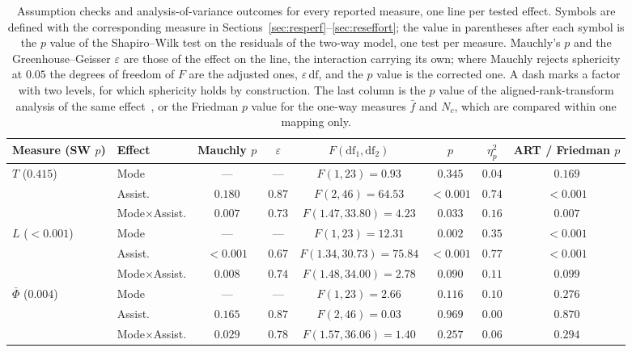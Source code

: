 \begin{table}[p]
\centering
\footnotesize
\caption[Assumption checks and analysis-of-variance outcomes for every reported measure]{Assumption checks and analysis-of-variance outcomes for every reported measure, one line per tested effect. Symbols are defined with the corresponding measure in Sections~\ref{sec:resperf}--\ref{sec:reseffort}; the value in parentheses after each symbol is the $p$ value of the Shapiro--Wilk test on the residuals of the two-way model, one test per measure. Mauchly's $p$ and the Greenhouse--Geisser $\varepsilon$ are those of the effect on the line, the interaction carrying its own; where Mauchly rejects sphericity at $0.05$ the degrees of freedom of $F$ are the adjusted ones, $\varepsilon\,\mathrm{df}$, and the $p$ value is the corrected one. A dash marks a factor with two levels, for which sphericity holds by construction. The last column is the $p$ value of the aligned-rank-transform analysis of the same effect~\cite{wobbrock2011art}, or the Friedman $p$ value for the one-way measures $\bar f$ and $N_c$, which are compared within one mapping only.}
\label{tab:assumptions}
\setlength{\tabcolsep}{3.5pt}\scriptsize
\begin{tabular}{@{}llcccccc@{}}
\toprule
Measure (SW $p$) & Effect & Mauchly $p$ & $\varepsilon$ & $F(\mathrm{df}_1,\mathrm{df}_2)$ & $p$ & $\eta^2_p$ & ART / Friedman $p$ \\
\midrule
$T$ ($0.415$) & Mode & --- & --- & $F(1,23)=0.93$ & $0.345$ & $0.04$ & $0.169$ \\
 & Assist. & $0.180$ & $0.87$ & $F(2,46)=64.53$ & $<0.001$ & $0.74$ & $<0.001$ \\
 & Mode$\times$Assist. & $0.007$ & $0.73$ & $F(1.47,33.80)=4.23$ & $0.033$ & $0.16$ & $0.007$ \\
\addlinespace[2pt]
$L$ ($<0.001$) & Mode & --- & --- & $F(1,23)=12.31$ & $0.002$ & $0.35$ & $<0.001$ \\
 & Assist. & $<0.001$ & $0.67$ & $F(1.34,30.73)=75.84$ & $<0.001$ & $0.77$ & $<0.001$ \\
 & Mode$\times$Assist. & $0.008$ & $0.74$ & $F(1.48,34.00)=2.78$ & $0.090$ & $0.11$ & $0.099$ \\
\addlinespace[2pt]
$\bar{\Phi}$ ($0.004$) & Mode & --- & --- & $F(1,23)=2.66$ & $0.116$ & $0.10$ & $0.276$ \\
 & Assist. & $0.165$ & $0.87$ & $F(2,46)=0.03$ & $0.969$ & $0.00$ & $0.870$ \\
 & Mode$\times$Assist. & $0.029$ & $0.78$ & $F(1.57,36.06)=1.40$ & $0.257$ & $0.06$ & $0.294$ \\

\end{tabular}
\end{table}

